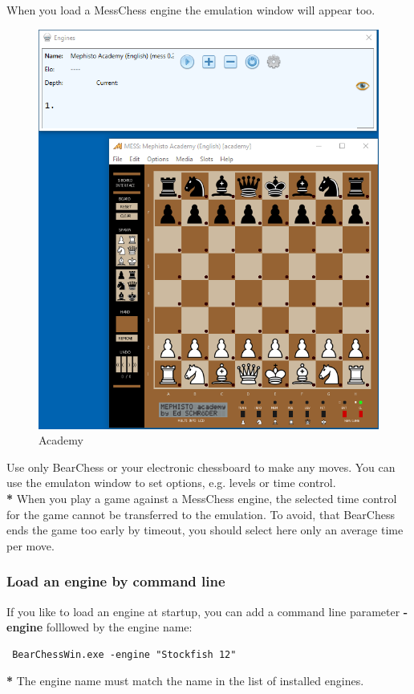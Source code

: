 \documentclass[11pt,a4paper]{article}
\begin{document}
When you load a MessChess engine the emulation window will appear too.
\begin{figure}[H]
	\centering
	\includegraphics[scale=0.7]{MessChess4.png}
	\caption{Academy}
	\label{fig:MessChess4}
\end{figure}
Use only BearChess or your electronic chessboard to make any moves. You can use the emulaton window to set options, e.g. levels or time control.\\
{\color{red}\textbf{*}} When you play a game against a MessChess engine, the selected time control for the game cannot be transferred to the emulation. To avoid, that BearChess ends the game too early by timeout, you should select here only an average time per move.

\subsubsection{Load an engine by command line}
If you like to load an engine at startup, you can add a command line parameter \textbf{-engine} folllowed by the engine name:
\begin{verbatim}
 BearChessWin.exe -engine "Stockfish 12"
\end{verbatim}
{\color{red}\textbf{*}} The engine name must match the name in the list of installed engines.
\end{document}
